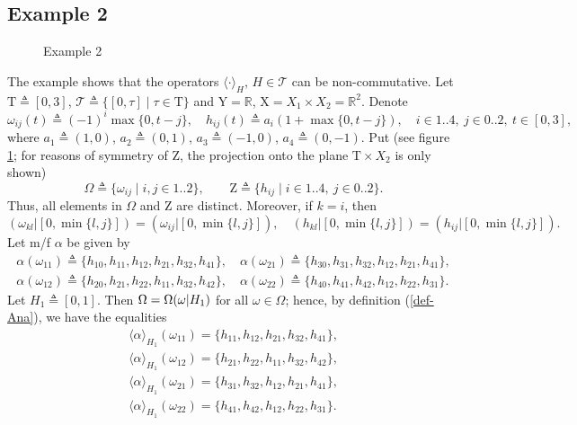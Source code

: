 \documentclass[sn-mathphys,Numbered,pdflatex]{sn-jnl}%
\theoremstyle{thmstyleone}%
\theoremstyle{thmstyletwo}%
\theoremstyle{thmstylethree}%
\newcommand{\nint}[2]{{{#1}..{#2}}}%
\newcommand{\mydef}{\mathrel{\triangleq}}%
\newcommand{\res}[2]{\ensuremath{(#1|#2)}}%
\newcommand{\RA}{\ensuremath{\mathbb R}}%
\newcommand{\naY}{\ensuremath{\mathrm{Y}}}%
\newcommand{\naX}{\ensuremath{\mathrm{X}}}%
\newcommand{\naOm}{\ensuremath{\Omega}}%
\newcommand{\naZ}{\ensuremath{\mathrm{Z}}}%
\newcommand{\naT}{\ensuremath{\mathrm{T}}}%
\newcommand{\naTc}{\ensuremath{\mathcal{T}}}%
\newcommand{\naOmo}[2]{\naOm\setbox0=\hbox{\text{$#1$}}\ifdim\wd0=0pt\else\res{#1}{#2}\fi}%
\newcommand{\Ana}[2]{\ensuremath{\langle{#1}\rangle_{#2}}}%
\newcommand{\fref}[1]{{\rm(\ref{#1})}}   %
\begin{document}
\subsection{Example 2}
\label{ex2}

\begin{figure}[!ht]
\begin{center}
\hspace*{-0.5cm}
\caption{Example 2}\label{pic2-ex2}
\end{center}
\end{figure}

The example shows that the operators $\Ana{\cdot}{H}$, $H\in\naTc$ can be non-commutative.
Let $\naT\mydef[0,3]$, $\naTc\mydef\{[0,\tau]\mid\tau\in\naT\}$ and $\naY=\RA$, $\naX=X_1\times X_2=\RA^2$.
Denote
$$
\omega_{ij}(t)\mydef(-1)^i\max\{0,t-j\},\quad h_{ij}(t)\mydef a_i\left(1+\max\{0,t-j \}\right),\quad i\in\nint14,\ j\in\nint02,\ t\in[0,3],
$$
where $a_1\mydef(1,0)$, $a_2\mydef(0,1)$, $a_3\mydef(-1,0)$, $a_4\mydef(0,-1)$.
Put (see figure \ref{pic2-ex2}; for reasons of symmetry of $\naZ$, the projection onto the plane $\naT\times X_2$ is only shown)
$$
\naOm\mydef\{\omega_{ij}\mid i,j\in\nint12\},\qquad \naZ\mydef\{h_{ij}\mid i\in\nint14,\ j\in\nint02\}.
$$
Thus, all elements in $\naOm$ and $\naZ$ are distinct.
Moreover, if $k=i$, then
$$
\res{\omega_{kl}}{[0,\min\{l,j\}]}=\res{\omega_{ij}}{[0,\min\{l,j\}]}, \quad\res{h_{kl}}{[0,\min\{l,j\}]}=\res{h_{ij}}{[0,\min\{l,j\}]}.
$$
Let m/f $\alpha$ be given by
\begin{gather*}
   \alpha(\omega_{11})\mydef\{h_{10},h_{11},h_{12},h_{21},h_{32},h_{41}\},\quad
   \alpha( \omega_{21})\mydef\{h_{30},h_{31},h_{32},h_{12},h_{21},h_{41}\}, \\
   \alpha(\omega_{12})\mydef\{h_{20},h_{21},h_{22},h_{11},h_{32},h_{42}\},\quad
   \alpha(\omega_{22})\mydef\{h_{40},h_{41},h_{42},h_{12},h_{22},h_{31}\}.
\end{gather*}
Let $H_1\mydef[0,1]$.
Then $\naOm=\naOmo{\omega}{H_1}$ for all $\omega\in\naOm$;
hence, by definition \fref{def-Ana}, we have the equalities
\begin{gather*}
  \Ana\alpha{H_1}(\omega_{11})=\{h_{11},h_{12},h_{21},h_{32},h_{41}\}, \\
  \Ana\alpha{H_1}(\omega_{12})=\{h_{21},h_{22},h_{11},h_{32},h_{42}\}, \\
  \Ana\alpha{H_1}(\omega_{21})=\{h_{31},h_{32},h_{12},h_{21},h_{41}\}, \\
  \Ana\alpha{H_1}(\omega_{22})=\{h_{41},h_{42},h_{12},h_{22},h_{31}\}.
\end{gather*}
\end{document}
